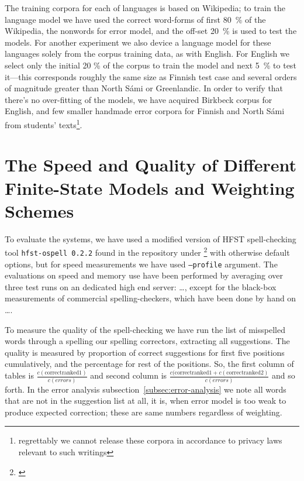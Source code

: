 \documentclass[a4paper,12pt]{article}
\begin{document}
The training corpora for each of languages is based on Wikipedia; to train the
language model we have used the correct word-forms of first 80~\% of the
Wikipedia, the nonwords for error model, and the off-set 20~\% is used to test
the models. For another experiment we also device a language model for these
languages solely from the corpus training data, as with English.  For English
we select only the 
initial 20 \% of the corpus to train the model and next 5~\% to test
 it---this corresponds roughly the same
size as Finnish test case and several orders of magnitude greater than North
Sámi or Greenlandic. In order to verify that there's no over-fitting of the
models, we have acquired Birkbeck corpus for English, and few smaller handmade
error corpora for Finnish and North Sámi from students'
texts\footnote{regrettably we cannot release these corpora in accordance to
privacy laws relevant to such writings}.

\section{The Speed and Quality of Different Finite-State Models and Weighting
Schemes}
\label{sec:evaluation}

To evaluate the systems, we have used a modified version of HFST spell-checking
tool \texttt{hfst-ospell 0.2.2} found in the repository under 
\footnote{\url{}} with otherwise default
options, but for speed measurements we have used \texttt{--profile} argument.
The evaluations on speed and memory use have been performed by averaging over
three test runs on an dedicated high end server: \ldots, except for the
black-box measurements of commercial spelling-checkers, which have been done by
hand on \ldots.

To measure the quality of the spell-checking we have run the list of misspelled
words through a spelling our spelling correctors, extracting all suggestions.
The quality is measured by proportion of correct suggestions for first five
positions cumulatively, and the percentage for rest of the positions. So, the
first column of tables is $\frac{c(\mathrm{correct ranked 1})}{c(errors)}$ and
second column is $\frac{c(\mathrm{correct ranked 1} + c(\mathrm{correct ranked
2})}{c(errors)}$ and so forth. In the error analysis
subsection~\ref{subsec:error-analysis} we note all words that are not in the
suggestion list at all, it is, when error model is too weak to produce expected
correction; these are same numbers regardless of weighting.
\end{document}
